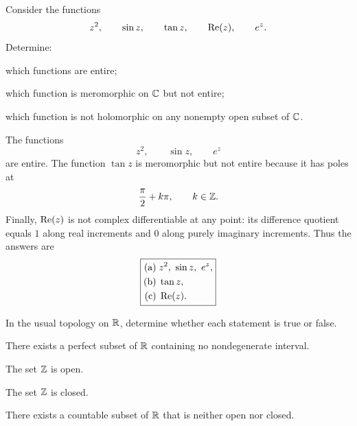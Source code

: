     \begin{expectedproblem}
        Consider the functions
        \[
            z^2,
            \qquad
            \sin z,
            \qquad
            \tan z,
            \qquad
            \operatorname{Re}(z),
            \qquad
            e^z.
        \]
        Determine:
        \begin{problemsubparts}
            \item which functions are entire;
            \item which function is meromorphic on $\mathbb{C}$ but not entire;
            \item which function is not holomorphic on any nonempty open
                  subset of $\mathbb{C}$.
        \end{problemsubparts}
    \end{expectedproblem}

    \begin{solution}
        The functions
        \[
            z^2,
            \qquad
            \sin z,
            \qquad
            e^z
        \]
        are entire. The function $\tan z$ is meromorphic but not entire because
        it has poles at
        \[
            \frac{\pi}{2}+k\pi,
            \qquad
            k\in\mathbb{Z}.
        \]
        Finally, $\operatorname{Re}(z)$ is not complex differentiable at any point: its
        difference quotient equals $1$ along real increments and $0$ along
        purely imaginary increments. Thus the answers are
        \[
            \boxed{
                \begin{aligned}
                    \text{(a)}\;&z^2,\ \sin z,\ e^z,\\
                    \text{(b)}\;&\tan z,\\
                    \text{(c)}\;&\operatorname{Re}(z).
                \end{aligned}
            }
        \]
    \end{solution}

    \begin{expectedproblem}
        In the usual topology on $\mathbb{R}$, determine whether each statement is true
        or false.
        \begin{problemchoices}
            \item There exists a perfect subset of $\mathbb{R}$ containing no
                  nondegenerate interval.
            \item The set $\mathbb{Z}$ is open.
            \item The set $\mathbb{Z}$ is closed.
            \item There exists a countable subset of $\mathbb{R}$ that is neither
                  open nor closed.
        \end{problemchoices}
    \end{expectedproblem}

